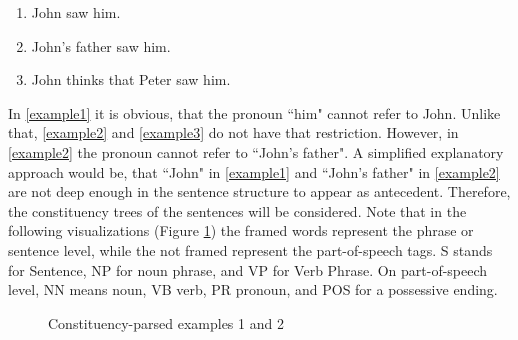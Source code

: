 \begin{center}
	\begin{enumerate}[label={(\arabic*)}]
	\item  \label{example1} John saw him.
	\item  \label{example2} John's father saw him.
	\item  \label{example3} John thinks that Peter saw him.
	\end{enumerate}
\end{center}

In \ref{example1} it is obvious, that the pronoun ``him" cannot refer to John. Unlike that, \ref{example2} and \ref{example3} do not have that restriction. However, in \ref{example2} the pronoun cannot refer to ``John's father". A simplified explanatory approach would be, that ``John" in \ref{example1} and ``John's father" in \ref{example2} are not deep enough in the sentence structure to appear as antecedent. Therefore, the constituency trees of the sentences will be considered. Note that in the following visualizations (Figure \ref{fig:twoTreeExample}) the framed words represent the phrase or sentence level, while the not framed represent the part-of-speech tags. S stands for Sentence, NP for noun phrase, and VP for Verb Phrase. On part-of-speech level, NN means noun, VB verb, PR pronoun, and POS for a possessive ending. 

\begin{figure}[h]
    \centering\sffamily
{}
    \caption{Constituency-parsed examples 1 and 2}%
    \label{fig:twoTreeExample}%
\end{figure}

